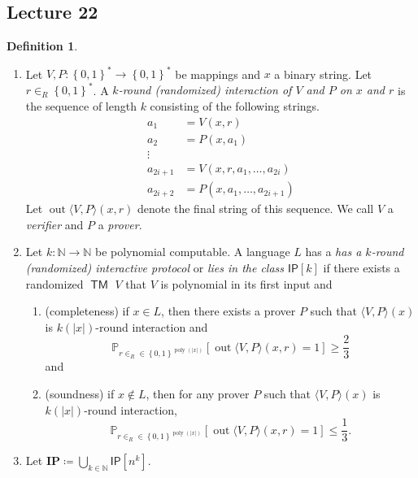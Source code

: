 \documentclass[10pt,letterpaper,cm]{nupset}
\theoremstyle{definition}
\newtheorem{definition}{Definition}[subsection]
\theoremstyle{theorem}
\theoremstyle{remark}
\newcommand{\N}{\mathbb N}
\newcommand{\1}{\mathbf{1}}
\newcommand{\0}{\vec 0}
\DeclareMathOperator{\out}{out}
\DeclareMathOperator{\TM}{\mathsf{TM}}
\DeclareMathOperator{\poly}{poly}
\begin{document}
\subsection{Lecture 22}

\begin{definition} $ $
\begin{enumerate}
\item  Let $V, P: \left\{0,1\right\}^{\ast} \to \left\{0,1\right\}^{\ast}$ be mappings and $x$ a binary string. Let $r\in_R \left\{0,1\right\}^{\ast}$. A \textit{$k$-round (randomized) interaction of $V$ and $P$ on $x$ and $r$} is the sequence of length $k$  consisting of the following strings.
\[
\begin{aligned} a_{1} &=V(x, r) \\ a_{2} &=P\left(x, a_{1}\right) \\ \vdots & \\ a_{2 i+1} &=V\left(x,r, a_{1}, \ldots, a_{2 i}\right) \\ a_{2 i+2} &=P\left(x, a_{1}, \ldots, a_{2 i+1}\right) \end{aligned}
\] Let $\out{\langle V, P\rangle (x, r)}$ denote the final string of this sequence. We call $V$ a \textit{verifier} and $P$ a \textit{prover}.
\item Let $k : \N \to \N$ be polynomial computable. A language $L$ has a \textit{has a $k$-round (randomized) interactive protocol} or \textit{lies in the class $\mathsf{IP}[k]$} if there exists a randomized $\TM$ $V$ that $V$ is polynomial in its first input and
\begin{enumerate}
\item (completeness) if $x\in L$, then there exists a prover $P$ such that $\langle V, P\rangle(x)$ is $k(\left\lvert{x}\right\rvert)$-round interaction and $$\mathbb{P}_{r\in_R \in \left\{0,1\right\}^{\poly(\left\lvert{x}\right\rvert)}}\left[\out{\langle V, P\rangle(x, r)} =1\right] \geq \frac{2}{3}$$ and 
\item (soundness) if $x\notin L$, then for any prover $P$ such that $\langle V, P\rangle(x)$ is $k(\left\lvert{x}\right\rvert)$-round interaction, $$\mathbb{P}_{r\in_R \in \left\{0,1\right\}^{\poly(\left\lvert{x}\right\rvert)}}\left[\out{\langle V, P\rangle(x, r)} =1\right] \leq \frac{1}{3}.$$
\end{enumerate}
\item Let $\mathbf{IP} \coloneqq \bigcup_{k\in \N}\mathsf{IP}\left[n^k\right]$.
\end{enumerate}
\end{definition}
\end{document}
